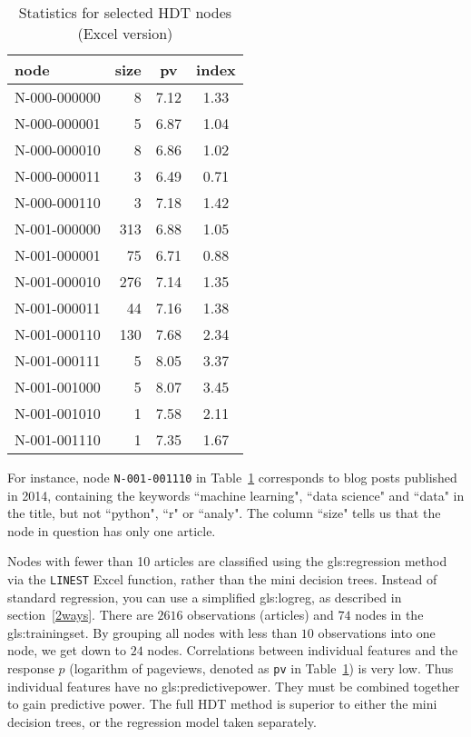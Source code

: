 \documentclass[oneside,10pt]{book}
\renewcommand{\arraystretch}{1.4} %
\begin{document}
\renewcommand{\arraystretch}{1.2} %
\begin{table}%
\begin{center}
\begin{tabular}{lrcc}
\hline
node & size & pv & index \\
\hline
N-000-000000 & 8 & 7.12 & 1.33 \\
N-000-000001 & 5 & 6.87 & 1.04 \\
N-000-000010 & 8 & 6.86 & 1.02 \\
N-000-000011 & 3 & 6.49 & 0.71 \\
N-000-000110 & 3 & 7.18 & 1.42 \\
N-001-000000 & 313 & 6.88 & 1.05 \\
N-001-000001 & 75 & 6.71 & 0.88 \\
N-001-000010 & 276 & 7.14 & 1.35 \\
N-001-000011 & 44 & 7.16 & 1.38 \\
N-001-000110 & 130 & 7.68 & 2.34 \\
N-001-000111 & 5 & 8.05 & 3.37 \\
N-001-001000 & 5 & 8.07 & 3.45 \\
N-001-001010 & 1 & 7.58 & 2.11 \\
N-001-001110 & 1 & 7.35 & 1.67 \\
\hline
\end{tabular}
\caption{\label{fffnode}Statistics for selected HDT nodes (Excel version)}
\end{center}
\end{table}
\renewcommand{\arraystretch}{1.0} %

For instance, node \texttt{N-001-001110} in Table~\ref{fffnode} corresponds to blog posts published in 2014, containing the keywords ``machine learning", ``data science" and ``data" in the title, but not ``python", ``r" or ``analy". The column ``size" tells us that the node in question has only one article.


Nodes with fewer than 10 articles are classified using the \gls{gls:regression} method via the \texttt{LINEST} Excel function, rather than the mini decision trees. Instead of standard regression, you can use a simplified \gls{gls:logreg},
 as described in section~\ref{2ways}. There are $\num{2616}$ observations (articles) and $74$ nodes in the \gls{gls:trainingset}. By grouping all nodes with less than $10$ observations into one node, we get down to $24$ nodes. Correlations between individual features and the response $p$ (logarithm of pageviews, denoted as
 \texttt{pv} in Table~\ref{fffnode}) is very low. Thus individual features have no \gls{gls:predictivepower}. They must be combined together
 to gain predictive power. The full HDT method is superior to either the mini decision trees, or the regression model taken separately.
\end{document}
